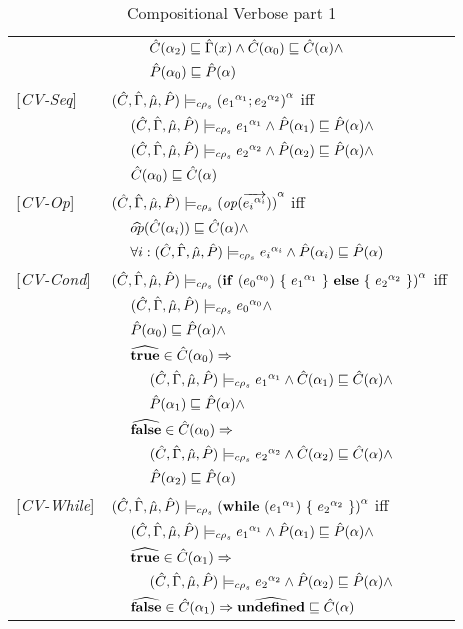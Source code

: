 \begin{table}
\begin{tabular}{l l l l}
&&&$\Cat(\all_2) \sqsubseteq \Env(x) \wedge \Cat(\all_0) \sqsubseteq \Cat(\all) \wedge$\\
&&&$\Pat(\all_0) \sqsubseteq \Pat(\all) $\\
{[\textit{CV-Seq}]}&\multicolumn{3}{l}{$ \ccestl {\lbt 1;\lbt 2} $ iff } \\ 
&&\multicolumn{2}{l}{$\ccest {\lbt 1} \wedge\Pat(\all_1) \sqsubseteq \Pat(\all) \wedge$} \\
&&\multicolumn{2}{l}{$\ccest {\lbt 2}\wedge \Pat(\all_2) \sqsubseteq \Pat(\all) \wedge$} \\
&&\multicolumn{2}{l}{$\Cat(\all_0) \sqsubseteq \Cat(\all)$} \\
{[\textit{CV-Op}]}&\multicolumn{3}{l}{$ \ccestl {\op (\vec{\lbt i})} $ iff}\\
&&\multicolumn{2}{l}{$\widehat{op} (\Cat(\all_i)) \sqsubseteq \Cat(\all) \wedge$}\\
&&\multicolumn{2}{l}{$\forall i : \ccest {\lbt i} \wedge \Pat(\all_i) \sqsubseteq \Pat(\all)  $}\\
{[\textit{CV-Cond}]}&\multicolumn{3}{l}{$\ccestl{\cond {\lbt 0} {\lbt 1} {\lbt 2}} $ iff}\\
&&\multicolumn{2}{l}{$ \ccest {\lbt 0} \wedge $}\\
&&\multicolumn{2}{l}{$\Pat(\all_0) \sqsubseteq \Pat(\all) \wedge$} \\
&&\multicolumn{2}{l}{$\widehat{\true} \in \Cat(\all_0) \Rightarrow$}\\
&&&$\ccest {\lbt 1} \wedge \Cat(\all_1) \sqsubseteq \Cat(\all)\wedge$\\
&&&$\Pat(\all_1) \sqsubseteq \Pat(\all) \wedge$ \\
&&\multicolumn{2}{l}{$\widehat{\false} \in \Cat(\all_0) \Rightarrow$}\\
&&&$\ccest {\lbt 2} \wedge \Cat(\all_2) \sqsubseteq \Cat(\all) \wedge$\\
&&&$\Pat(\all_2) \sqsubseteq \Pat(\all)$ \\
{[\textit{CV-While}]}&\multicolumn{3}{l}{$\ccestl {\while {\lbt 1} {\lbt 2}} $ iff}\\
&&\multicolumn{2}{l}{$ \ccest {\lbt 1} \wedge \Pat(\all_1) \sqsubseteq \Pat(\all) \wedge$}\\
&&\multicolumn{2}{l}{$\widehat{\true} \in \Cat(\all_1) \Rightarrow$}\\
&&&$\ccest {\lbt 2} \wedge \Pat(\all_2) \sqsubseteq \Pat(\all)\wedge$\\
&&\multicolumn{2}{l}{$\widehat{\false} \in \Cat(\all_1) \Rightarrow \widehat{\undef} \sqsubseteq \Cat(\all)$}\\
\end{tabular}
\caption{Compositional Verbose part 1}
\label{tab:CompVerb1}
\end{table}

